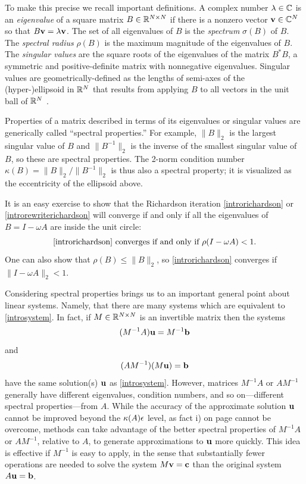 To make this precise we recall important definitions.  A complex number $\lambda \in \mathbb{C}$ is an \emph{eigenvalue} of a square matrix $B\in\mathbb{R}^{N\times N}$ if there is a nonzero vector $\mathbf{v}\in\mathbb{C}^N$ so that $B \mathbf{v} = \lambda \mathbf{v}$.  The set of all eigenvalues of $B$ is the \emph{spectrum} $\sigma(B)$ of $B$.  The \emph{spectral radius} $\rho(B)$ is the maximum magnitude of the eigenvalues of $B$.  The \emph{singular values} are the square roots of the eigenvalues of the matrix $B^*B$, a symmetric and positive-definite matrix with nonnegative eigenvalues.  Singular values are geometrically-defined as the lengths of semi-axes of the (hyper-)ellipsoid in $\mathbb{R}^N$ that results from applying $B$ to all vectors in the unit ball of $\mathbb{R}^N$ \citep{TrefethenBau}.

Properties of a matrix described in terms of its eigenvalues or singular values are generically called ``spectral properties.''  For example, $\|B\|_2$ is the largest singular value of $B$ and $\|B^{-1}\|_2$ is the inverse of the smallest singular value of $B$, so these are spectral properties.  The 2-norm condition number $\kappa(B)=\|B\|_2/\|B^{-1}\|_2$ is thus also a spectral property; it is visualized as the eccentricity of the ellipsoid above.

It is an easy exercise to show that the Richardson iteration \eqref{introrichardson} or \eqref{introrewriterichardson} will converge if and only if all the eigenvalues of $B=I-\omega A$ are inside the unit circle:
\begin{equation}
\text{\eqref{introrichardson} converges if and only if } \rho(I-\omega A) < 1. \label{introconvergethm}
\end{equation}
One can also show that $\rho(B) \le \|B\|_2$, so \eqref{introrichardson} converges if $\|I-\omega A\|_2 < 1$.

Considering spectral properties brings us to an important general point about linear systems.  Namely, that there are many systems which are equivalent to \eqref{introsystem}.  In fact, if $M\in\mathbb{R}^{N\times N}$ is an invertible matrix then the systems
\begin{equation}
(M^{-1} A) \mathbf{u} = M^{-1} \mathbf{b} \label{introleftpre}
\end{equation}
and
\begin{equation}
(A M^{-1}) (M\mathbf{u}) = \mathbf{b} \label{introrightpre}
\end{equation}
have the same solution(s) $\mathbf{u}$ as \eqref{introsystem}.  However, matrices $M^{-1} A$ or $A M^{-1}$ generally have different eigenvalues, condition numbers, and so on---different spectral properties---from $A$.  While the accuracy of the approximate solution $\mathbf{u}$ cannot be improved beyond the $\kappa(A) \epsilon$ level, as fact i) on page \pageref{limittoaccuracy} cannot be overcome, methods can take advantage of the better spectral properties of $M^{-1} A$ or $A M^{-1}$, relative to $A$, to generate approximations to $\mathbf{u}$ more quickly.  This idea is effective if $M^{-1}$ is easy to apply, in the sense that substantially fewer operations are needed to solve the system $M\mathbf{v}=\mathbf{c}$ than the original system $A\mathbf{u}=\mathbf{b}$.

